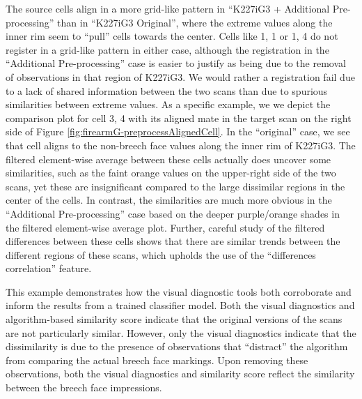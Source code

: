 \documentclass[11pt,]{isuthesis}
\begin{document}
The source cells align in a more grid-like pattern in ``K227iG3 + Additional Pre-processing'' than in ``K227iG3 Original'', where the extreme values along the inner rim seem to ``pull'' cells towards the center.
Cells like 1, 1 or 1, 4 do not register in a grid-like pattern in either case, although the registration in the ``Additional Pre-processing'' case is easier to justify as being due to the removal of observations in that region of K227iG3.
We would rather a registration fail due to a lack of shared information between the two scans than due to spurious similarities between extreme values.
As a specific example, we we depict the comparison plot for cell 3, 4 with its aligned mate in the target scan on the right side of Figure \ref{fig:firearmG-preprocessAlignedCell}.
In the ``original'' case, we see that cell aligns to the non-breech face values along the inner rim of K227iG3.
The filtered element-wise average between these cells actually does uncover some similarities, such as the faint orange values on the upper-right side of the two scans, yet these are insignificant compared to the large dissimilar regions in the center of the cells.
In contrast, the similarities are much more obvious in the ``Additional Pre-processing'' case based on the deeper purple/orange shades in the filtered element-wise average plot.
Further, careful study of the filtered differences between these cells shows that there are similar trends between the different regions of these scans, which upholds the use of the ``differences correlation'' feature.

This example demonstrates how the visual diagnostic tools both corroborate and inform the results from a trained classifier model.
Both the visual diagnostics and algorithm-based similarity score indicate that the original versions of the scans are not particularly similar.
However, only the visual diagnostics indicate that the dissimilarity is due to the presence of observations that ``distract'' the algorithm from comparing the actual breech face markings.
Upon removing these observations, both the visual diagnostics and similarity score reflect the similarity between the breech face impressions.
\end{document}
